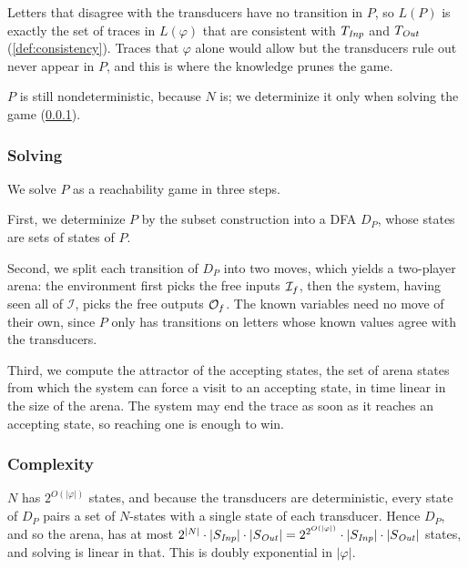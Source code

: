 Letters that disagree with the transducers have no transition in $P$, so $L(P)$ is exactly the set of traces in $L(\varphi)$ that are consistent with $T_{\mathit{Inp}}$ and $T_{\mathit{Out}}$ (\cref{def:consistency}).
Traces that $\varphi$ alone would allow but the transducers rule out never appear in $P$, and this is where the knowledge prunes the game.

$P$ is still nondeterministic, because $N$ is; we determinize it only when solving the game (\cref{sec:nfa-solve}).

\subsubsection{Solving}\label{sec:nfa-solve}
We solve $P$ as a reachability game in three steps.

First, we determinize $P$ by the subset construction into a DFA $D_P$, whose states are sets of states of $P$.

Second, we split each transition of $D_P$ into two moves, which yields a two-player arena: the environment first picks the free inputs $\mathcal{I}_{f}$, then the system, having seen all of $\mathcal{I}$, picks the free outputs $\mathcal{O}_{f}$.
The known variables need no move of their own, since $P$ only has transitions on letters whose known values agree with the transducers.

Third, we compute the attractor of the accepting states, the set of arena states from which the system can force a visit to an accepting state, in time linear in the size of the arena.
The system may end the trace as soon as it reaches an accepting state, so reaching one is enough to win.


\subsubsection{Complexity}

$N$ has $2^{O(|\varphi|)}$ states, and because the transducers are deterministic, every state of $D_P$ pairs a set of $N$-states with a single state of each transducer.
Hence $D_P$, and so the arena, has at most $2^{|N|} \cdot |S_{\mathit{Inp}}| \cdot |S_{\mathit{Out}}| = 2^{2^{O(|\varphi|)}} \cdot |S_{\mathit{Inp}}| \cdot |S_{\mathit{Out}}|$ states, and solving is linear in that.
This is doubly exponential in $|\varphi|$.

